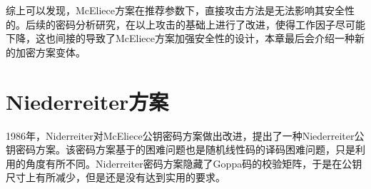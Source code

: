 \begin{table}[H]
\centering
{}
\caption{常见攻击工作因子}\label{wf_table}
\end{table}
综上可以发现，McEliece方案在推荐参数下，直接攻击方法是无法影响其安全性的。后续的密码分析研究，在以上攻击的基础上进行了改进，使得工作因子尽可能下降，这也间接的导致了McEliece方案加强安全性的设计，本章最后会介绍一种新的加密方案变体。

\section{Niederreiter方案}
1986年，Niderreiter对McEliece公钥密码方案做出改进，提出了一种Niederreiter公钥密码方案。该密码方案基于的困难问题也是随机线性码的译码困难问题，只是利用的角度有所不同。Niderreiter密码方案隐藏了Goppa码的校验矩阵，于是在公钥尺寸上有所减少，但是还是没有达到实用的要求。

